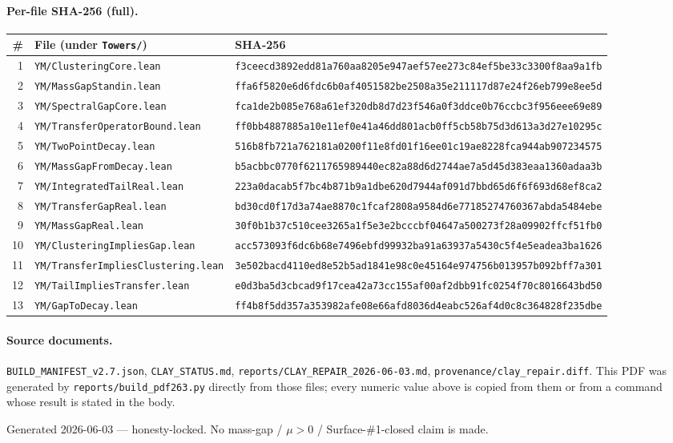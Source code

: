 \documentclass[11pt]{article}
\begin{document}
\paragraph{Per-file SHA-256 (full).}
{\footnotesize
\begin{longtable}{@{}r p{4.2cm} p{9.3cm}@{}}
\toprule
\# & File (under \texttt{Towers/}) & SHA-256 \\
\midrule
\endhead
1 & \texttt{YM/ClusteringCore.lean} & \texttt{f3ceecd3892edd81a760aa8205e947aef57ee273c84ef5be33c3300f8aa9a1fb} \\
2 & \texttt{YM/MassGapStandin.lean} & \texttt{ffa6f5820e6d6fdc6b0af4051582be2508a35e211117d87e24f26eb799e8ee5d} \\
3 & \texttt{YM/SpectralGapCore.lean} & \texttt{fca1de2b085e768a61ef320db8d7d23f546a0f3ddce0b76ccbc3f956eee69e89} \\
4 & \texttt{YM/TransferOperatorBound.lean} & \texttt{ff0bb4887885a10e11ef0e41a46dd801acb0ff5cb58b75d3d613a3d27e10295c} \\
5 & \texttt{YM/TwoPointDecay.lean} & \texttt{516b8fb721a762181a0200f11e8fd01f16ee01c19ae8228fca944ab907234575} \\
6 & \texttt{YM/MassGapFromDecay.lean} & \texttt{b5acbbc0770f6211765989440ec82a88d6d2744ae7a5d45d383eaa1360adaa3b} \\
7 & \texttt{YM/IntegratedTailReal.lean} & \texttt{223a0dacab5f7bc4b871b9a1dbe620d7944af091d7bbd65d6f6f693d68ef8ca2} \\
8 & \texttt{YM/TransferGapReal.lean} & \texttt{bd30cd0f17d3a74ae8870c1fcaf2808a9584d6e77185274760367abda5484ebe} \\
9 & \texttt{YM/MassGapReal.lean} & \texttt{30f0b1b37c510cee3265a1f5e3e2bcccbf04647a500273f28a09902ffcf51fb0} \\
10 & \texttt{YM/ClusteringImpliesGap.lean} & \texttt{acc573093f6dc6b68e7496ebfd99932ba91a63937a5430c5f4e5eadea3ba1626} \\
11 & \texttt{YM/TransferImpliesClustering.lean} & \texttt{3e502bacd4110ed8e52b5ad1841e98c0e45164e974756b013957b092bff7a301} \\
12 & \texttt{YM/TailImpliesTransfer.lean} & \texttt{e0d3ba5d3cbcad9f17cea42a73cc155af00af2dbb91fc0254f70c8016643bd50} \\
13 & \texttt{YM/GapToDecay.lean} & \texttt{ff4b8f5dd357a353982afe08e66afd8036d4eabc526af4d0c8c364828f235dbe} \\
\bottomrule
\end{longtable}}

\paragraph{Source documents.} \texttt{BUILD\_MANIFEST\_v2.7.json},
\texttt{CLAY\_STATUS.md}, \texttt{reports/CLAY\_REPAIR\_2026-06-03.md},
\texttt{provenance/clay\_repair.diff}. This PDF was generated by
\texttt{reports/build\_pdf263.py} directly from those files; every numeric value
above is copied from them or from a command whose result is stated in the body.

\vfill
\begin{center}\small
Generated 2026-06-03 --- honesty-locked.
No mass-gap / $\mu>0$ / Surface-\#1-closed claim is made.
\end{center}
\end{document}
